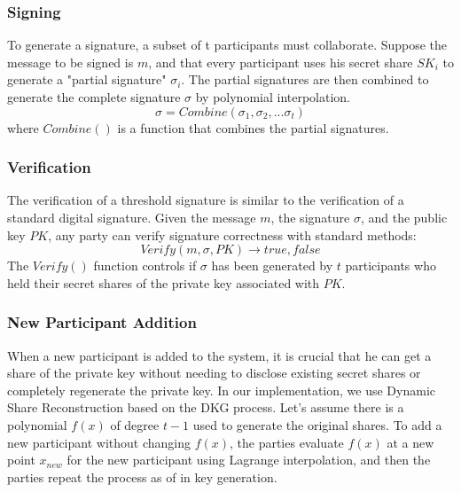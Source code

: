 \documentclass{article}
\begin{document}
\subsubsection{Signing}
To generate a signature, a subset of t participants must collaborate. Suppose the message to be signed is  \(m\), and that every participant uses his secret share \(SK_i\) to generate a "partial signature" \(\sigma_i\).
The partial signatures are then combined to generate the complete signature \(\sigma\) by polynomial interpolation.
\[\sigma=Combine(\sigma_1,\sigma_2,...\sigma_t)\]
where \(Combine()\) is a function that combines the partial signatures.

\subsubsection{Verification}
The verification of a threshold signature is similar to the verification of a standard digital signature. Given the message \(m\), the signature \(\sigma\), and the public key \(PK\), any party can verify signature correctness with standard methods:
\[Verify(m,\sigma,PK) \rightarrow true,false\]
The \(Verify()\) function controls if \(\sigma\) has been generated by \(t\) participants who held their secret shares of the private key associated with \(PK\).

\subsubsection{New Participant Addition}
When a new participant is added to the system, it is crucial that he can get a share of the private key without needing to disclose existing secret shares or completely regenerate the private key. In our implementation, we use Dynamic Share Reconstruction based on the DKG process.
Let's assume there is a polynomial \(f(x)\) of degree \(t-1\) used to generate the original shares. To add a new participant without changing \(f(x)\), the parties evaluate \(f(x)\) at a new point \(x_{new}\)  for the new participant using Lagrange interpolation, and then the parties repeat the process as of in key generation.
\end{document}
